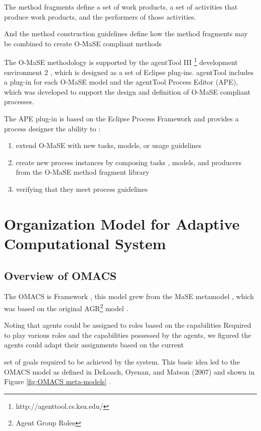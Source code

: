 The method fragments define a set of work products, a set of activities that produce work products, and the performers of those activities.

And the method construction guidelines define how the method fragments may be
combined to create O-MaSE compliant methods

The O-MaSE methodology is supported by the agentTool III \footnote{http://agenttool.cs.ksu.edu/}
 development environment 2 , 
which is designed as a set of Eclipse plug-ins. agentTool includes a plug-in for each O-MaSE model 
and the agentTool Process Editor (APE), which was developed to support the design and definition 
of O-MaSE compliant processes. \cite{omacs7}

The APE plug-in is based on the Eclipse Process Framework and provides a process designer the ability to : 
\begin{enumerate}
\item 
	extend O-MaSE with new tasks, models, or usage guidelines
\item
	create new process instances by composing tasks
, models, and producers from the O-MaSE method fragment library  
\item
	 verifying that they meet process guidelines
\end{enumerate} 
 
\section{  Organization Model for Adaptive Computational System }
\subsection{ Overview of OMACS }
The OMACS is Framework , this model grew from the MaSE metamodel , 
which was based on the original AGR\footnote{Agent Group Roles}  model . \cite{omacs4}
 
Noting that agents could be assigned to roles based on the capabilities 
Required to play various roles and the capabilities possessed by the agents,
we figured the agents could adapt their assignments based on the current 


set of goals required to be achieved by the system.
This basic idea led to the OMACS  model as defined in DeLoach,
Oyenan, and Matson (2007) and shown in Figure \ref{fig:OMACS meta-models} . \cite{omacs4}

